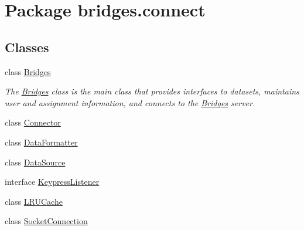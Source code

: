 \hypertarget{namespacebridges_1_1connect}{}\section{Package bridges.\+connect}
\label{namespacebridges_1_1connect}
\subsection*{Classes}
\begin{DoxyCompactItemize}
\item 
class \mbox{\hyperlink{classbridges_1_1connect_1_1_bridges}{Bridges}}
\begin{DoxyCompactList}\small\item\em The \mbox{\hyperlink{classbridges_1_1connect_1_1_bridges}{Bridges}} class is the main class that provides interfaces to datasets, maintains user and assignment information, and connects to the \mbox{\hyperlink{classbridges_1_1connect_1_1_bridges}{Bridges}} server. \end{DoxyCompactList}\item 
class \mbox{\hyperlink{classbridges_1_1connect_1_1_connector}{Connector}}
\item 
class \mbox{\hyperlink{classbridges_1_1connect_1_1_data_formatter}{Data\+Formatter}}
\item 
class \mbox{\hyperlink{classbridges_1_1connect_1_1_data_source}{Data\+Source}}
\item 
interface \mbox{\hyperlink{interfacebridges_1_1connect_1_1_keypress_listener}{Keypress\+Listener}}
\item 
class \mbox{\hyperlink{classbridges_1_1connect_1_1_l_r_u_cache}{L\+R\+U\+Cache}}
\item 
class \mbox{\hyperlink{classbridges_1_1connect_1_1_socket_connection}{Socket\+Connection}}
\end{DoxyCompactItemize}
